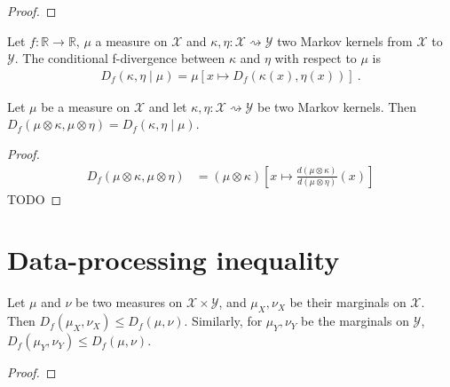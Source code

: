 \begin{proof}
\end{proof}

\begin{definition}
  \label{def:condFDiv}
  Let $f : \mathbb{R} \to \mathbb{R}$, $\mu$ a measure on $\mathcal X$ and $\kappa, \eta : \mathcal X \rightsquigarrow \mathcal Y$ two Markov kernels from $\mathcal X$ to $\mathcal Y$. The conditional f-divergence between $\kappa$ and $\eta$ with respect to $\mu$ is
  \begin{align*}
  D_f(\kappa, \eta \mid \mu) = \mu\left[x \mapsto D_f(\kappa(x), \eta(x))\right] \: .
  \end{align*}
\end{definition}

\begin{lemma}
  \label{lem:fDiv_compProd_left}
  Let $\mu$ be a measure on $\mathcal X$ and let $\kappa, \eta : \mathcal X \rightsquigarrow \mathcal Y$ be two Markov kernels.
  Then $D_f(\mu \otimes \kappa, \mu \otimes \eta) = D_f(\kappa, \eta \mid \mu)$.
\end{lemma}

\begin{proof}
\begin{align*}
D_f(\mu \otimes \kappa, \mu \otimes \eta)
&= (\mu \otimes \kappa)\left[ x \mapsto \frac{d (\mu \otimes \kappa)}{d (\mu \otimes \eta)}(x) \right]
\end{align*}
TODO
\end{proof}

\section{Data-processing inequality}

\begin{theorem}[Monotonicity]
  \label{thm:fDiv_fst_le}
  Let $\mu$ and $\nu$ be two measures on $\mathcal X \times \mathcal Y$, and $\mu_X, \nu_X$ be their marginals on $\mathcal X$.
  Then $D_f(\mu_X, \nu_X) \le D_f(\mu, \nu)$.
  Similarly, for $\mu_Y, \nu_Y$ be the marginals on $\mathcal Y$, $D_f(\mu_Y, \nu_Y) \le D_f(\mu, \nu)$.
\end{theorem}

\begin{proof}
\end{proof}

